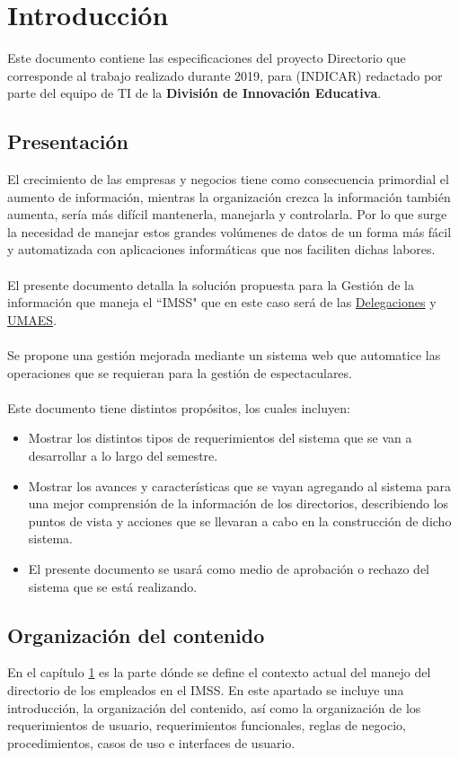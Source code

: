 \chapter{Introducción}
\label{cap:Introducción}
Este documento contiene las especificaciones del proyecto Directorio que corresponde al trabajo realizado durante 2019, para (INDICAR) redactado por parte del equipo de TI de la \textbf{División de Innovación Educativa}.

\section{Presentación}
El crecimiento de las empresas y negocios tiene como consecuencia primordial el aumento de información, mientras la organización crezca la información también aumenta, sería más difícil mantenerla, manejarla y controlarla. Por lo que surge la necesidad de manejar estos grandes volúmenes de datos de un forma más fácil y automatizada con aplicaciones informáticas que nos faciliten dichas labores.
\\\\
El presente documento detalla la solución propuesta para la Gestión de la información que maneja el ``IMSS" que en este caso será de las \hyperlink{Glo:Delegaciones}{Delegaciones} y \hyperlink{Glo:UMAE}{UMAES}.
\\\\
Se propone una gestión mejorada mediante un sistema web que automatice las operaciones que se requieran para la gestión de espectaculares.
\\\\
Este documento tiene distintos propósitos, los cuales incluyen:
\begin{itemize}
    \item Mostrar los distintos tipos de requerimientos del sistema que se van a desarrollar a lo largo del semestre.
    \item Mostrar los avances y características que se vayan agregando al sistema para una mejor comprensión de la información de los directorios, describiendo los puntos de vista y acciones que se llevaran a cabo en la construcción de dicho sistema.
    \item El presente documento se usará como medio de aprobación o rechazo del sistema que se está realizando.
\end{itemize}

\section{Organización del contenido}
En el capítulo \ref{cap:Introducción} es la parte dónde se define el contexto actual del manejo del directorio de los empleados en el IMSS. En este apartado se incluye una introducción, la organización del contenido, así como la organización de los requerimientos de usuario, requerimientos funcionales, reglas de negocio, procedimientos, casos de uso e interfaces de usuario. \\

